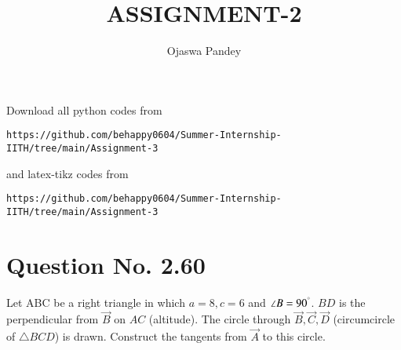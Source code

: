 \documentclass[journal,12pt,twocolumn]{IEEEtran}
\begin{document}
     \def\topbox#1{\raisebox{-\baselineskip}[0in][0in]{#1}}
     \def\midbox#1{\raisebox{-0.5\baselineskip}[0in][0in]{#1}}
\vspace{3cm}
\title{ASSIGNMENT-2}
\author{Ojaswa Pandey}
\maketitle
\newpage
\bigskip
\renewcommand{\thefigure}{\theenumi}
\renewcommand{\thetable}{\theenumi}
Download all python codes from 
\begin{lstlisting}
https://github.com/behappy0604/Summer-Internship-IITH/tree/main/Assignment-3
\end{lstlisting}
%
and latex-tikz codes from 
%
\begin{lstlisting}
https://github.com/behappy0604/Summer-Internship-IITH/tree/main/Assignment-3
\end{lstlisting}
%
\section{Question No. 2.60}   
Let ABC be a right triangle in which $a = 8, c = 6$ and $\angle B = 90^{\degree}$.  $BD$ is the 
perpendicular from $\vec{B}$ on $AC$ (altitude). The circle through $\vec{B}, \vec{C}, \vec{D}$ (circumcircle of $\triangle BCD$) is drawn.  Construct the 
tangents from $\vec{A}$ to this circle.
\end{document}
